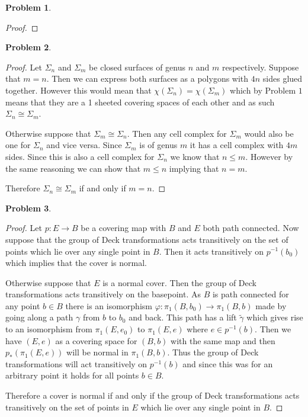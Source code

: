 \documentclass[10pt]{article}
\newcommand{\sk}{\vskip 10mm}
\theoremstyle{plain}
\newtheorem{problem}{Problem}
\theoremstyle{remark}
\begin{document}
\sk

\begin{problem} %
  
\end{problem}

\begin{proof}
  
\end{proof}

\sk

\begin{problem} %
  
\end{problem}

\begin{proof}
  Let $\Sigma_n$ and $\Sigma_m$ be closed surfaces of genus $n$ and $m$
  respectively. Suppose that $m=n$. Then we can express
  both surfaces as a polygons with $4n$ sides glued together.
  However this would mean that $\chi(\Sigma_n)=\chi(\Sigma_m)$ which by
  Problem $1$ means that they are a 1 sheeted covering
  spaces of each other and as such $\Sigma_n\cong \Sigma_m$.

  Otherwise suppose that $\Sigma_m\cong\Sigma_n$. Then any cell complex
  for $\Sigma_m$ would also be one for $\Sigma_n$ and vice versa.
  Since $\Sigma_m$ is of genus $m$ it has a cell complex
  with $4m$ sides. Since this is also a cell complex
  for $\Sigma_n$ we know that $n\leq m$. However by the same
  reasoning we can show that $m\leq n$ implying that
  $n=m$.

  Therefore $\Sigma_n\cong\Sigma_m$ if and only if $m=n$.
\end{proof}

\sk

\begin{problem} %
  
\end{problem}

\begin{proof}
  Let $p:E\rightarrow B$ be a covering map with $B$ and $E$ both path connected. Now
  suppose that the group of Deck transformations acts transitively
  on the set of points which lie over any single point in $B$. Then
  it acts transitively on $p^{-1}(b_0)$ which implies that the
  cover is normal.

  Otherwise suppose that $E$ is a normal cover. Then the group of Deck
  transformations acts transitively on the basepoint. As
  $B$ is path connected for any point $b\in B$ there is
  an isomorphism  $\varphi:\pi_1(B,b_0)\rightarrow \pi_1(B,b)$ made by going along
  a path $\gamma$ from $b$ to $b_0$ and back. This path has a lift
  $\widetilde{\gamma}$ which gives rise to an isomorphism from
  $\pi_1(E,e_0)$ to $\pi_1(E,e)$ where $e\in p^{-1}(b)$. Then we
  have $(E,e)$ as a covering space for $(B,b)$ with the
  same map and then $p_*(\pi_1(E,e))$ will be normal in
  $\pi_1(B,b)$. Thus the group of Deck transformations will
  act transitively on $p^{-1}(b)$ and since this was for
  an arbitrary point it holds for all points $b\in B$.

  Therefore a cover is normal if and only if the group of
  Deck transformations acts transitively on the set of points
  in $E$ which lie over any single point in $B$.
\end{proof}
\end{document}
